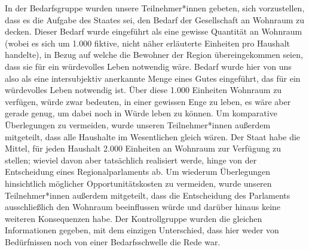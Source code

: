\documentclass[justified,nobib,symmetric,twoside]{tufte-handout}
\begin{document}
In der Bedarfsgruppe wurden unsere Teilnehmer*innen gebeten, sich vorzustellen, dass es die Aufgabe des Staates sei, den Bedarf der Gesellschaft an Wohnraum zu decken.
Dieser Bedarf wurde eingeführt als eine gewisse Quantität an Wohnraum (wobei es sich um 1.000 fiktive, nicht näher erläuterte Einheiten pro Haushalt handelte), in Bezug auf welche die Bewohner der Region übereingekommen seien, dass sie für ein würdevolles Leben notwendig wäre.
Bedarf wurde hier von uns also als eine intersubjektiv anerkannte Menge eines Gutes eingeführt, das für ein würdevolles Leben notwendig ist.
Über diese 1.000 Einheiten Wohnraum zu verfügen, würde zwar bedeuten, in einer gewissen Enge zu leben, es wäre aber gerade genug, um dabei noch in Würde leben zu können.
Um komparative Überlegungen zu vermeiden, wurde unseren Teilnehmer*innen außerdem mitgeteilt, dass alle Haushalte im Wesentlichen gleich wären.
Der Staat habe die Mittel, für jeden Haushalt 2.000 Einheiten an Wohnraum zur Verfügung zu stellen; wieviel davon aber tatsächlich realisiert werde, hinge von der Entscheidung eines Regionalparlaments ab.
Um wiederum Überlegungen hinsichtlich möglicher Opportunitätskosten zu vermeiden, wurde unseren Teilnehmer*innen außerdem mitgeteilt, dass die Entscheidung des Parlaments ausschließlich den Wohnraum beeinflussen würde und darüber hinaus keine weiteren Konsequenzen habe.
Der Kontrollgruppe wurden die gleichen Informationen gegeben, mit dem einzigen Unterschied, dass hier weder von Bedürfnissen noch von einer Bedarfsschwelle die Rede war.
\end{document}
